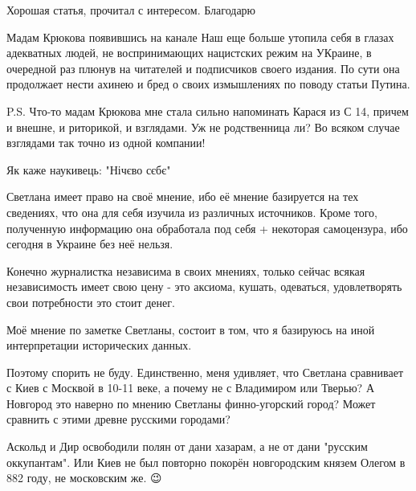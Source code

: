 \begin{itemize}
Хорошая статья, прочитал с интересом. Благодарю

 

Мадам Крюкова появившись на канале Наш еще больше утопила себя в глазах
адекватных людей, не воспринимающих нацистских режим на УКраине, в очередной
раз плюнув на читателей и подписчиков своего издания. По сути она продолжает
нести ахинею и бред о своих измышлениях по поводу статьи Путина.

P.S. Что-то мадам Крюкова мне стала сильно напоминать Карася из С 14, причем и
внешне, и риторикой, и взглядами. Уж не родственница ли? Во всяком случае
взглядами так точно из одной компании!

 
Як каже наукивець: "Нічєво сєбє"

 

Светлана имеет право на своё мнение, ибо её мнение базируется на тех сведениях,
что она для себя изучила из различных источников. Кроме того, полученную
информацию она обработала под себя + некоторая самоцензура, ибо сегодня в
Украине без неё нельзя. 

Конечно журналистка независима в своих мнениях, только сейчас всякая
независимость имеет свою цену - это аксиома, кушать, одеваться, удовлетворять
свои потребности это стоит денег. 

Моё мнение по заметке Светланы, состоит в том, что я базируюсь на иной
интерпретации исторических данных.

Поэтому спорить не буду. Единственно, меня удивляет, что Светлана сравнивает с
Киев с Москвой в 10-11 веке, а почему не с Владимиром или Тверью? А Новгород
это наверно по мнению Светланы финно-угорский город? Может сравнить с этими
древне русскими городами? 

Аскольд и Дир освободили полян от дани хазарам, а не от дани "русским
оккупантам". Или Киев не был повторно покорён новгородским князем Олегом в 882
году, не московским же. 😉 


\end{itemize}
